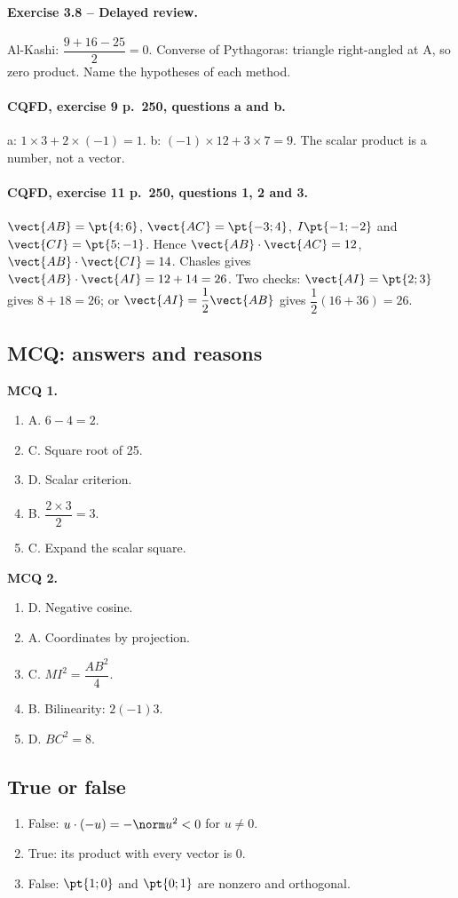 \paragraph{Exercise 3.8 -- Delayed review.} Al-Kashi: $\dfrac{9+16-25}{2}=0$. Converse of Pythagoras: triangle right-angled at A, so zero product. Name the hypotheses of each method.
\paragraph{CQFD, exercise 9 p.~250, questions a and b.} a: $1\times3+2\times(-1)=1$. b: $(-1)\times12+3\times7=9$. The scalar product is a number, not a vector.
\paragraph{CQFD, exercise 11 p.~250, questions 1, 2 and 3.} $\vect{AB}=\pt{4;6}$, $\vect{AC}=\pt{-3;4}$, $I\pt{-1;-2}$ and $\vect{CI}=\pt{5;-1}$. Hence $\vect{AB}\cdot\vect{AC}=12$, $\vect{AB}\cdot\vect{CI}=14$. Chasles gives $\vect{AB}\cdot\vect{AI}=12+14=26$. Two checks: $\vect{AI}=\pt{2;3}$ gives $8+18=26$; or $\vect{AI}=\dfrac12\vect{AB}$ gives $\dfrac12(16+36)=26$.
\subsection*{MCQ: answers and reasons}
\textbf{MCQ 1.}
\begin{enumerate}
\item A. $6-4=2$.
\item C. Square root of 25.
\item D. Scalar criterion.
\item B. $\dfrac{2\times 3}{2}=3$.
\item C. Expand the scalar square.
\end{enumerate}
\textbf{MCQ 2.}
\begin{enumerate}
\item D. Negative cosine.
\item A. Coordinates by projection.
\item C. $MI^2=\dfrac{AB^2}{4}$.
\item B. Bilinearity: $2(-1)3$.
\item D. $BC^2=8$.
\end{enumerate}
\subsection*{True or false}
\begin{enumerate}
\item False: $u\cdot(-u)=-\norm u^2<0$ for $u\ne0$.
\item True: its product with every vector is 0.
\item False: $\pt{1;0}$ and $\pt{0;1}$ are nonzero and orthogonal.
\end{enumerate}
